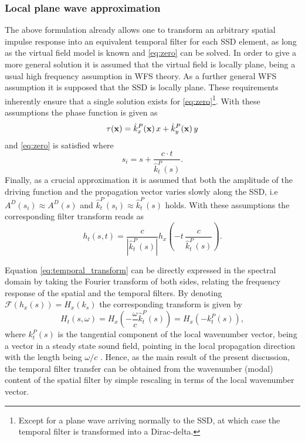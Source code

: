 \documentclass[conference]{IEEEtran}
\begin{document}
\subsubsection{Local plane wave approximation}
The above formulation already allows one to transform an arbitrary spatial impulse response into an equivalent temporal filter for each SSD element, as long as the virtual field model is known and \eqref{eq:zero} can be solved.
In order to give a more general solution it is assumed that the virtual field is locally plane, being a usual high frequency assumption in WFS theory.
As a further general WFS assumption it is supposed that the SSD is locally plane.
These requirements inherently ensure that a single solution exists for \eqref{eq:zero}\footnote{Except for a plane wave arriving normally to the SSD, at which case the temporal filter is transformed into a Dirac-delta.}.
With these assumptions the phase function is given as
\begin{equation}
    \tau(\mathbf{x}) = \hat{k}^P_x(\mathbf{x}) \, x +  \hat{k}^P_y(\mathbf{x}) \, y
\end{equation}
and \eqref{eq:zero} is satisfied where
\begin{equation}
    s_i = s + \frac{c \cdot t}{\hat{k}_t^P(s)}
    .
\end{equation}
Finally, as a crucial approximation it is assumed that both the amplitude of the driving function and the propagation vector varies slowly along the SSD, i.e $A^D(s_i) \approx A^D(s)$ and $\hat{k}_t^P(s_i) \approx \hat{k}_t^P(s)$ holds.
With these assumptions the corresponding filter transform reads as
\begin{equation}
    h_t\left(s,t\right) =\frac{ c }{|\hat{k}_t^P(s)|} h_x\left(-t \,\frac{c}{\hat{k}_t^P(s)}\right).
    \label{eq:temporal_transform}
\end{equation}

Equation \eqref{eq:temporal_transform} can be directly expressed in the spectral domain by taking the Fourier transform of both sides, relating the frequency response of the spatial and the temporal filters.
By denoting $\mathcal{F}\left( h_x(s)\right) = H_x(k_s)$ the corresponding transform is given by
\begin{equation}
    H_t\left(s,\omega\right) = H_x\left(-\frac{\omega}{c}\hat{k}_t^P(s)\right) = H_x\left(-k_t^P(s)\right),
    \label{eq:frequency_transform}
\end{equation}
where $k_t^P(s)$ is the tangential component of the local wavenumber vector, being a vector in a steady state sound field, pointing in the local propagation direction with the length being $\omega/c$ \cite{Firtha2019phd}.
Hence, as the main result of the present discussion, the temporal filter transfer can be obtained from the wavenumber (modal) content of the spatial filter by simple rescaling in terms of the local wavenumber vector.
\end{document}
